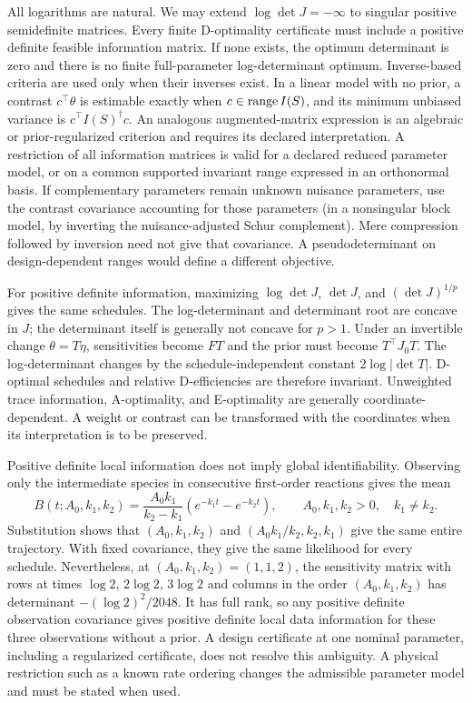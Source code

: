 All logarithms are natural. We may extend $\log\det J=-\infty$ to singular
positive semidefinite matrices. Every finite D-optimality certificate must
include a positive definite feasible information matrix. If none exists,
the optimum determinant is zero and there is no finite full-parameter
log-determinant optimum. Inverse-based criteria are used only when their
inverses exist. In a linear model with no prior, a contrast $c^\top\theta$
is estimable exactly when $c\in\operatorname{range} I(S)$, and its minimum unbiased
variance is $c^\top I(S)^\dagger c$. An analogous augmented-matrix expression
is an algebraic or prior-regularized criterion and requires its declared
interpretation. A restriction of all information matrices is valid for a
declared reduced parameter model, or on a common supported invariant range
expressed in an orthonormal basis. If complementary parameters remain unknown
nuisance parameters, use the contrast covariance accounting for those
parameters (in a nonsingular block model, by inverting the nuisance-adjusted
Schur complement). Mere compression followed by inversion need not give that
covariance.
A pseudodeterminant on design-dependent ranges would define a different
objective.

For positive definite information, maximizing $\log\det J$, $\det J$, and
$(\det J)^{1/p}$ gives the same schedules. The log-determinant and determinant
root are concave in $J$; the determinant itself is generally not concave for
$p>1$. Under an invertible change $\theta=T\eta$, sensitivities become $FT$
and the prior must become $T^\top J_0T$. The log-determinant changes by the
schedule-independent constant $2\log|\det T|$. D-optimal schedules and
relative D-efficiencies are therefore invariant. Unweighted trace information,
A-optimality, and E-optimality are generally coordinate-dependent. A weight
or contrast can be transformed with the coordinates when its interpretation
is to be preserved.

Positive definite local information does not imply global identifiability.
Observing only the intermediate species in consecutive first-order reactions
gives the mean
\begin{equation}
 B(t;A_0,k_1,k_2)=\frac{A_0k_1}{k_2-k_1}
 (e^{-k_1t}-e^{-k_2t}),\qquad A_0,k_1,k_2>0,\quad k_1\ne k_2.
 \label{eq:rate-swap}
\end{equation}
Substitution shows that $(A_0,k_1,k_2)$ and
$(A_0k_1/k_2,k_2,k_1)$ give the same entire trajectory. With fixed covariance,
they give the same likelihood for every schedule. Nevertheless, at
$(A_0,k_1,k_2)=(1,1,2)$, the sensitivity matrix with rows at times
$\log2$, $2\log2$, $3\log2$ and columns in the order $(A_0,k_1,k_2)$
has determinant $-(\log2)^2/2048$. It has full rank, so any positive definite
observation covariance gives positive definite local data information for
these three observations without a prior. A design certificate at one nominal
parameter, including a regularized certificate, does not resolve
this ambiguity. A physical restriction such as a known rate ordering changes
the admissible parameter model and must be stated when used.

